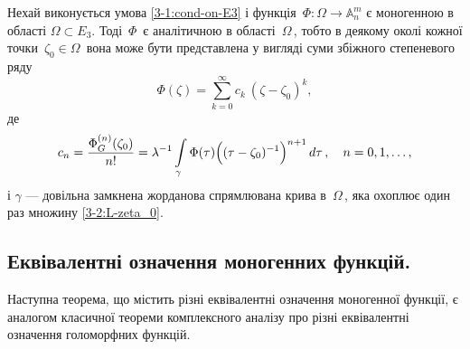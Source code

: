 \documentclass[11pt, reqno]{amsart}
\begin{document}
\begin{theorem}\label{3-2:teo-Taylor-An}
Нехай виконується умова \eqref{3-1:cond-on-E3} і функція\, $\Phi:\Omega\rightarrow\mathbb{A}_n^m$ є моногенною
в області $\Omega\subset E_3$. Тоді\, $\Phi$\, є аналітичною в області\, $\Omega$\,,
тобто в деякому околі кожної точки\, $\zeta_0\in\Omega$\, вона може бути пред\-став\-ле\-на у вигляді
суми збіжного степеневого ряду
\begin{equation}
\label{3-2:st-riad}
 \Phi(\zeta)=\sum\limits_{k=0}^{\infty} c_k \  (\zeta-\zeta_0)^k,
\end{equation}
де
\[c_n=\frac{\Phi_G^{(n)}(\zeta_0)}{n!}=\lambda^{-1}
\int\limits_{\gamma}\Phi(\tau)\Bigl((\tau-\zeta_0)^{-1}\Bigr)^{n+1}\,d\tau\,,\quad n=0,1,\dots,\]
і $\gamma$ --- довільна замкнена жорданова спрямлювана крива в\, $\Omega$\,,
яка охоплює один раз множину \eqref{3-2:L-zeta_0}.
\end{theorem}


\subsection{Еквівалентні означення моногенних функцій.}


Наступна теорема, що містить різні еквівалентні означення моногенної функції,
є аналогом класичної теореми комплексного аналізу про різні еквівалентні означення голоморфних функцій.

\vskip 1mm
\end{document}

